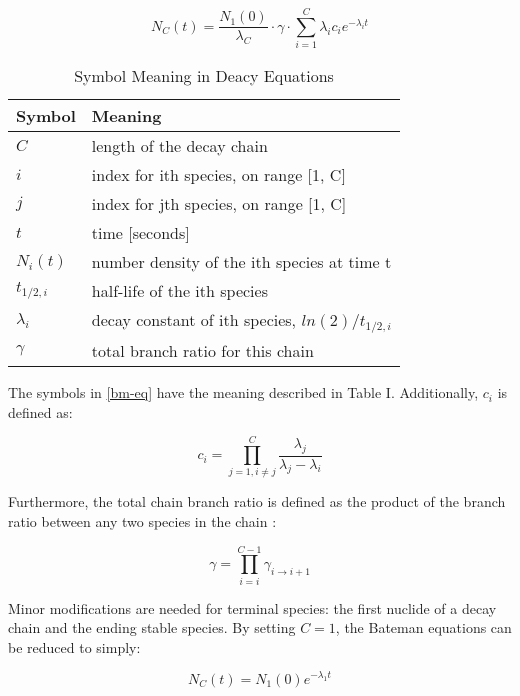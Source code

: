\documentclass{anstrans}
\begin{document}
\begin{equation}
\label{bm-eq}
N_C(t) = \frac{N_1(0)}{\lambda_C} \cdot \gamma \cdot \sum_{i=1}^C \lambda_i c_{i} e^{-\lambda_i t}
\end{equation}

\begin{table}[hbt]
\label{decay-symbol-meaning}
\caption{Symbol Meaning in Deacy Equations}
\begin{tabular}{|l|l|}
\hline
\textbf{Symbol} & \textbf{Meaning} \\
\hline
$C$         & length of the decay chain\\
$i$         & index for ith species, on range [1, C]\\
$j$         & index for jth species, on range [1, C]\\
$t$         & time [seconds]\\
$N_i(t)$    & number density of the ith species at time t\\
$t_{1/2,i}$ & half-life of the ith species\\
$\lambda_i$ & decay constant of ith species, $ln(2)/t_{1/2,i}$\\
$\gamma$    & total branch ratio for this chain\\
\hline
\end{tabular}
\end{table}

The symbols in \ref{bm-eq} have the meaning described in Table I.
Additionally, $c_{i}$ is defined as:

\begin{equation}
\label{c_i}
c_i = \prod_{j=1,i\ne j}^C \frac{\lambda_j}{\lambda_j - \lambda_i}
\end{equation}

Furthermore, the total chain branch ratio is defined as the product of the 
branch ratio between any two species in the chain \cite{harr2007precise}:

\begin{equation}
\label{gamma}
\gamma = \prod_{i=i}^{C-1} \gamma_{i \to i+1}
\end{equation}

Minor modifications are needed for terminal species: the first nuclide of a 
decay chain and the ending stable species. By setting $C=1$, the Bateman
equations can be reduced to simply:

\begin{equation}
\label{N_C}
N_C(t) = N_1(0) e^{-\lambda_1 t}
\end{equation}
\end{document}
